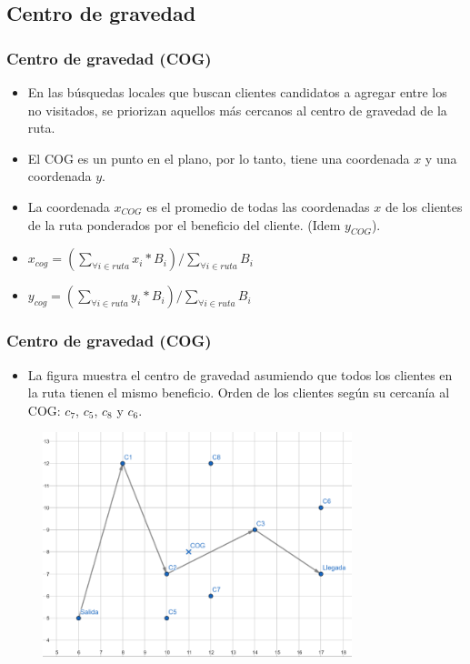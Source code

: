 \documentclass{beamer}
\begin{document}

\subsection{Centro de gravedad}

\begin{frame}
\frametitle{Centro de gravedad (COG)}

\begin{itemize}
    \item En las búsquedas locales que buscan clientes candidatos a agregar entre los no visitados, se priorizan aquellos más cercanos al centro de gravedad de la ruta.
    \pause 
    \item El COG es un punto en el plano, por lo tanto, tiene una coordenada $x$ y una coordenada $y$.
    \pause 
    \item La coordenada $x_{COG}$ es el promedio de todas las coordenadas $x$ de los clientes de la ruta ponderados por el beneficio del cliente. (Idem $y_{COG}$).
    \pause 
    \item $x_{cog} = (\sum_{\forall i \in ruta} x_i * B_i) / \sum_{\forall i \in ruta} B_i$
    \pause 
    \item $y_{cog} = (\sum_{\forall i \in ruta} y_i * B_i) / \sum_{\forall i \in ruta} B_i$
\end{itemize}

\end{frame}


\begin{frame}
\frametitle{Centro de gravedad (COG)}

\begin{itemize}
    \item La figura muestra el centro de gravedad asumiendo que todos los clientes en la ruta tienen el mismo beneficio. Orden de los clientes según su cercanía al COG: $c_7$, $c_5$, $c_8$ y $c_6$.
\end{itemize}

\begin{figure}[h]
	\centering
	\includegraphics[width=9cm]{COG}
	\label{fig:COG}
\end{figure}

\end{frame}
\end{document}

